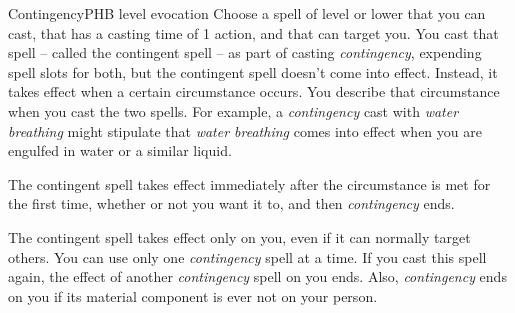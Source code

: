 \begin{spell}{Contingency}{PHB}{ level evocation}
{
}
Choose a spell of  level or lower that you can cast, that
has a casting time of 1 action, and that can target you.
You cast that spell -- called the contingent spell -- as part
of casting \emph{contingency}, expending spell slots for both, but
the contingent spell doesn't come into effect. Instead, it
takes effect when a certain circumstance occurs. You
describe that circumstance when you cast the two spells.
For example, a \emph{contingency} cast with \emph{water breathing}
might stipulate that \emph{water breathing} comes into effect
when you are engulfed in water or a similar liquid.

The contingent spell takes effect immediately after the
circumstance is met for the first time, whether or not you
want it to, and then \emph{contingency} ends.

The contingent spell takes effect only on you, even
if it can normally target others. You can use only one
\emph{contingency} spell at a time. If you cast this spell again,
the effect of another \emph{contingency} spell on you ends. Also,
\emph{contingency} ends on you if its material component is
ever not on your person.
\end{spell}